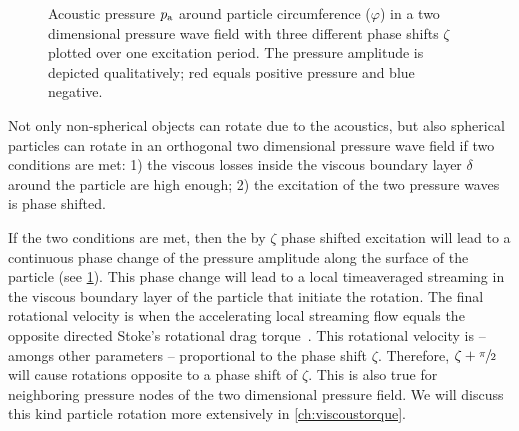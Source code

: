 \begin{figure}
\begin{subfigure}[b]{0.3\textwidth}
  \end{subfigure}
  \caption{Acoustic pressure $p_{\mathrm{a}}$ around particle circumference 
  ($\varphi$) in a two dimensional pressure wave field with three different 
phase shifts $\zeta$ plotted over one excitation period. The pressure amplitude 
is depicted qualitatively; red equals positive pressure and blue negative.}
  \label{fig:TA-VT}
 \end{figure}

Not only non-spherical objects can rotate due to the acoustics, but also 
spherical particles can rotate in an orthogonal two dimensional pressure wave 
field if two conditions are met: 1) the viscous losses inside the viscous 
boundary layer $\delta$ around the particle are high enough; 2) the excitation 
of the two pressure waves is phase shifted.

If the two conditions are met, then the by $\zeta$ phase shifted excitation 
will lead to a continuous phase change of the pressure amplitude along the 
surface of the particle (see \cref{fig:TA-VT}). This phase change will lead to 
a local timeaveraged streaming in the viscous boundary layer of the particle 
that initiate the rotation. The final rotational velocity is when the 
accelerating local streaming flow equals the opposite directed Stoke's 
rotational drag torque~\cite{Lamprecht2017}. This rotational velocity is -- 
amongs other parameters -- proportional to the phase shift $\zeta$. Therefore, 
$\zeta + \sfrac{\pi}{2}$ will cause rotations opposite to a phase shift of 
$\zeta$. This is also true for neighboring pressure nodes of the two 
dimensional pressure field. We will discuss this kind particle rotation more 
extensively in \cref{ch:viscoustorque}.

